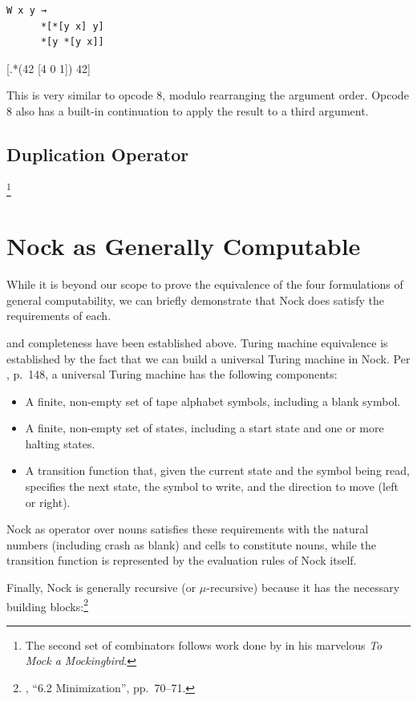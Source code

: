 \begin{lstlisting}[style=listingcomb,frame=tb]
W x y →
      *[*[y x] y]
      *[y *[y x]]
\end{lstlisting}
[.*(42 [4 0 1]) 42]


\noindent
This is very similar to opcode 8, modulo rearranging the argument order.  Opcode 8 also has a built-in continuation to apply the result to a third argument.

\subsection{ Duplication Operator}

\footnote{The second set of combinators follows work done by \citet{Smullyan1985} in his marvelous \emph{To Mock a Mockingbird}.}

\section{Nock as Generally Computable}

While it is beyond our scope to prove the equivalence of the four formulations of general computability, we can briefly demonstrate that Nock does satisfy the requirements of each.

 and  completeness have been established above.  Turing machine equivalence is established by the fact that we can build a universal Turing machine in Nock.  Per \citet*{Hopcroft1979}, p.~148, a universal Turing machine has the following components:

\begin{itemize}
  \item  A finite, non-empty set of tape alphabet symbols, including a blank symbol.
  \item  A finite, non-empty set of states, including a start state and one or more halting states.
  \item  A transition function that, given the current state and the symbol being read, specifies the next state, the symbol to write, and the direction to move (left or right).
\end{itemize}

\noindent
Nock as operator over nouns satisfies these requirements with the natural numbers (including crash \textct{[0 0]} as blank) and cells to constitute nouns, while the transition function is represented by the evaluation rules of Nock itself.

Finally, Nock is generally recursive (or $\mu$-recursive) because it has the necessary building blocks:\footnote{\citet{Boolos2002}, ``6.2 Minimization'', pp.~70–71.}

